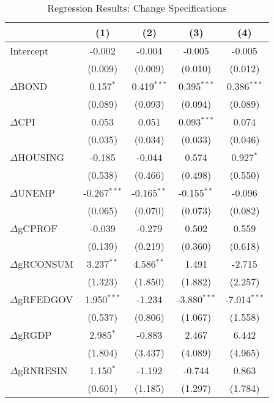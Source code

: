 \begin{table}[H]
\centering
\caption{Regression Results: Change Specifications}
\begin{tabular}{@{\extracolsep{5pt}}lcccc}
\hline
\hline
& (1) & (2) & (3) & (4) \\
\hline
Intercept & -0.002 & -0.004 & -0.005 & -0.005 \\
          & (0.009) & (0.009) & (0.010) & (0.012) \\

$\Delta$BOND & 0.157$^{*}$ & 0.419$^{***}$ & 0.395$^{***}$ & 0.386$^{***}$ \\
             & (0.089) & (0.093) & (0.094) & (0.089) \\

$\Delta$CPI & 0.053 & 0.051 & 0.093$^{***}$ & 0.074 \\
            & (0.035) & (0.034) & (0.033) & (0.046) \\

$\Delta$HOUSING & -0.185 & -0.044 & 0.574 & 0.927$^{*}$ \\
                & (0.538) & (0.466) & (0.498) & (0.550) \\

$\Delta$UNEMP & -0.267$^{***}$ & -0.165$^{**}$ & -0.155$^{**}$ & -0.096 \\
              & (0.065) & (0.070) & (0.073) & (0.082) \\

$\Delta$gCPROF & -0.039 & -0.279 & 0.502 & 0.559 \\
               & (0.139) & (0.219) & (0.360) & (0.618) \\

$\Delta$gRCONSUM & 3.237$^{**}$ & 4.586$^{**}$ & 1.491 & -2.715 \\
                 & (1.323) & (1.850) & (1.882) & (2.257) \\

$\Delta$gRFEDGOV & 1.950$^{***}$ & -1.234 & -3.880$^{***}$ & -7.014$^{***}$ \\
                 & (0.537) & (0.806) & (1.067) & (1.558) \\

$\Delta$gRGDP & 2.985$^{*}$ & -0.883 & 2.467 & 6.442 \\
              & (1.804) & (3.437) & (4.089) & (4.965) \\

$\Delta$gRNRESIN & 1.150$^{*}$ & -1.192 & -0.744 & 0.863 \\
                 & (0.601) & (1.185) & (1.297) & (1.784) \\


\end{tabular}
\end{table}
